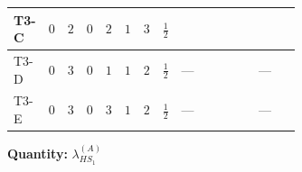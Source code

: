 \documentclass[8pt]{article}
\begin{document}
\begin{landscape}
\begin{longtable}{@{}llcccccc >{\raggedright\arraybackslash}p{0.21\linewidth} >{\raggedright\arraybackslash}p{0.21\linewidth} >{\raggedright\arraybackslash}p{0.21\linewidth}@{}}
\midrule
T3-C & $0$ & $2$ & $0$ & $2$ & $1$ & $3$ & $\frac{1}{2}$ & \scriptsize\adjustbox{max width=\linewidth}{$\begin{gathered} {\lambda_{HS_1}^{(A)}} (6 \operatorname{Tr}\!\left({Y_d}\,\left({Y_d}\right)^{\dagger}\right)+2 \operatorname{Tr}\!\left({Y_e}\,\left({Y_e}\right)^{\dagger}\right)+6 \operatorname{Tr}\!\left({Y_u}\,\left({Y_u}\right)^{\dagger}\right))\end{gathered}$} & \scriptsize\adjustbox{max width=\linewidth}{$\begin{gathered} +\frac{16}{3} {\lambda_5} \left({\lambda_5}\right)^{*}\end{gathered}$} & \scriptsize\adjustbox{max width=\linewidth}{$\begin{gathered} -9 {g_2}^2 {\lambda_{HS_1}^{(A)}}\end{gathered}$} \\
\midrule
T3-D & $0$ & $3$ & $0$ & $1$ & $1$ & $2$ & $\frac{1}{2}$ & --- & \scriptsize\adjustbox{max width=\linewidth}{$\begin{gathered} -\frac{8}{3} {\lambda_5} \left({\lambda_5}\right)^{*}\end{gathered}$} & --- \\
\midrule
T3-E & $0$ & $3$ & $0$ & $3$ & $1$ & $2$ & $\frac{1}{2}$ & --- & \scriptsize\adjustbox{max width=\linewidth}{$\begin{gathered} -\frac{4}{3} {\lambda_5} \left({\lambda_5}\right)^{*}\end{gathered}$} & --- \\
\midrule
\bottomrule
\end{longtable}
\clearpage
\noindent\textbf{Quantity: }$\lambda_{HS_1}^{(A)}$\par\smallskip

\end{landscape}
\end{document}
